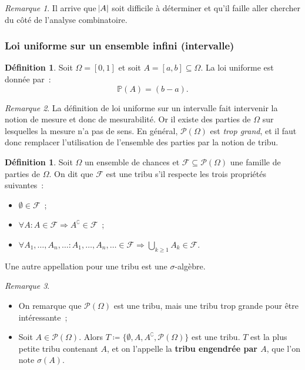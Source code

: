 \documentclass{article}
\renewcommand{\P}{\mathbb P}
\theoremstyle{definition}
\newtheorem{déf}[thm]{Définition}
\theoremstyle{remark}
\newtheorem*{rmq}{Remarque}
\begin{document}
		\begin{rmq} Il arrive que $\abs A$ soit difficile à déterminer et qu'il faille aller chercher du côté de l'analyse combinatoire. \end{rmq}

		\subsubsection{Loi uniforme sur un ensemble infini (intervalle)}

		\begin{déf} Soit $\Omega = [0, 1]$ et soit $A = [a, b] \subseteq \Omega$. La loi uniforme est donnée par~:
		\[\P(A) = (b-a).\] \end{déf}

		\begin{rmq} La définition de loi uniforme sur un intervalle fait intervenir la notion de mesure et donc de mesurabilité. Or il existe des parties de
		$\Omega$ sur lesquelles la mesure n'a pas de sens. En général, $\mathcal P(\Omega)$ est \emph{trop grand}, et il faut donc remplacer l'utilisation
		de l'ensemble des parties par la notion de tribu. \end{rmq}

		\begin{déf} Soit $\Omega$ un ensemble de chances et $\mathcal F \subseteq \mathcal P(\Omega)$ une famille de parties de $\Omega$. On dit que
		$\mathcal F$ est une tribu s'il respecte les trois propriétés suivantes~:
		\begin{itemize}
			\item $\emptyset \in \mathcal F$~;
			\item $\forall A : A \in \mathcal F \Rightarrow A^\complement \in \mathcal F$~;
			\item $\forall A_1, \dotsc, A_n, \ldots : A_1, \dotsc, A_n, \ldots \in \mathcal F \Rightarrow \bigcup_{k \geq 1}A_k \in \mathcal F$.
		\end{itemize}

		Une autre appellation pour une tribu est une $\sigma$-algèbre.
		\end{déf}

		\begin{rmq}~
		\begin{itemize}
			\item On remarque que $\mathcal P(\Omega)$ est une tribu, mais une tribu trop grande pour être intéressante~;
			\item Soit $A \in \mathcal P(\Omega)$. Alors $T \coloneqq \{\emptyset, A, A^\complement, \mathcal P(\Omega)\}$ est une tribu.
			      $T$ est la plus petite tribu contenant $A$, et on l'appelle la \textbf{tribu engendrée par $A$}, que l'on note $\sigma(A)$.
		\end{itemize}
		\end{rmq}
\end{document}

